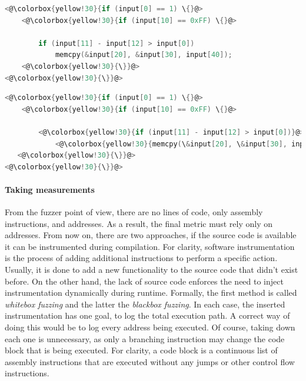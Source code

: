\begin{minipage}\linewidth
    \begin{lstlisting}[language=C,caption={Code coverage of the first testcase.},label={lst:tc1},captionpos=b]
<@\colorbox{yellow!30}{if (input[0] == 1) \{}@>
    <@\colorbox{yellow!30}{if (input[10] == 0xFF) \{}@>

        if (input[11] - input[12] > input[0])
            memcpy(&input[20], &input[30], input[40]);
    <@\colorbox{yellow!30}{\}}@>
<@\colorbox{yellow!30}{\}}@>
    \end{lstlisting}
\end{minipage}

\begin{minipage}\linewidth
    \begin{lstlisting}[language=C,caption={Code coverage of second testcase.},label={lst:tc2},captionpos=b]
<@\colorbox{yellow!30}{if (input[0] == 1) \{}@>
    <@\colorbox{yellow!30}{if (input[10] == 0xFF) \{}@>

        <@\colorbox{yellow!30}{if (input[11] - input[12] > input[0])}@>
            <@\colorbox{yellow!30}{memcpy(\&input[20], \&input[30], input[40]);}@>
   <@\colorbox{yellow!30}{\}}@>
<@\colorbox{yellow!30}{\}}@>
    \end{lstlisting}
\end{minipage}

\paragraph{Taking measurements}
From the fuzzer point of view, there are no lines of code, only assembly instructions, and addresses. As a result, the final metric must rely only on addresses. From now on, there are two approaches, if the source code is available it can be instrumented during compilation. For clarity, software instrumentation is the process of adding additional instructions to perform a specific action. Usually, it is done to add a new functionality to the source code that didn't exist before. On the other hand, the lack of source code enforces the need to inject instrumentation dynamically during runtime. Formally, the first method is called \textit{whitebox fuzzing} and the latter the \textit{blackbox fuzzing}. In each case, the inserted instrumentation has one goal, to log the total execution path. A correct way of doing this would be to log every address being executed. Of course, taking down each one is unnecessary, as only a branching instruction may change the code block that is being executed. For clarity, a code block is a continuous list of assembly instructions that are executed without any jumps or other control flow instructions. 

